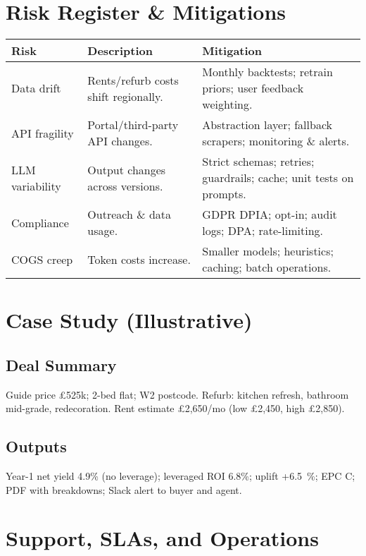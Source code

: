 \documentclass[12pt,a4paper]{article}
\begin{document}
\section{Risk Register \& Mitigations}
\begin{longtable}{@{}p{3cm}p{7.5cm}p{4.5cm}@{}}
\toprule
\textbf{Risk} & \textbf{Description} & \textbf{Mitigation} \\
\midrule
Data drift & Rents/refurb costs shift regionally. & Monthly backtests; retrain priors; user feedback weighting. \\
API fragility & Portal/third-party API changes. & Abstraction layer; fallback scrapers; monitoring \& alerts. \\
LLM variability & Output changes across versions. & Strict schemas; retries; guardrails; cache; unit tests on prompts. \\
Compliance & Outreach \& data usage. & GDPR DPIA; opt-in; audit logs; DPA; rate-limiting. \\
COGS creep & Token costs increase. & Smaller models; heuristics; caching; batch operations. \\
\bottomrule
\end{longtable}

\section{Case Study (Illustrative)}
\subsection{Deal Summary}
Guide price \pounds525k; 2-bed flat; W2 postcode. Refurb: kitchen refresh, bathroom mid-grade, redecoration. Rent estimate \pounds2{,}650/mo (low \pounds2{,}450, high \pounds2{,}850).

\subsection{Outputs}
Year-1 net yield 4.9\% (no leverage); leveraged ROI 6.8\%; uplift +\SI{6.5}{\percent}; EPC C; PDF with breakdowns; Slack alert to buyer and agent.

\section{Support, SLAs, and Operations}
\end{document}
